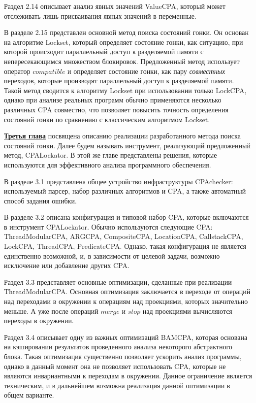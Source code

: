 Раздел 2.14 описывает анализ явных значений ValueCPA, который может отслеживать лишь присваивания явных значений в переменные.

В разделе 2.15 представлен основной метод поиска состояний гонки. 
Он основан на алгоритме Lockset, который определяет состояние гонки, как ситуацию, при которой происходит параллельный доступ к разделяемой памяти с непересекающимся множеством блокировок.
Предложенный метод использует оператор $compatible$ и определяет состояние гонки, как пару \textit{совместных} переходов, которые производят параллельный доступ к разделяемой памяти.
Такой метод сводится к алгоритму Lockset при использовании только LockCPA, однако при анализе реальных программ обычно применяются несколько различных CPA совместно, что позволяет повысить точность определения состояний гонки по сравнению с классическим алгоритмом Lockset.

\underline{\textbf{Третья глава}} посвящена описанию реализации разработанного метода поиска состояний гонки.
Далее будем называть инструмент, реализующий предложенный метод, CPALockator.
В этой же главе представлены решения, которые используются для эффективного анализа программного обеспечения.

В разделе 3.1 представлена общее устройство инфраструктуры CPAchecker: используемый парсер, набор различных алгоритмов и CPA, а также автоматный способ задания ошибки.

В разделе 3.2 описана конфигурация и типовой набор CPA, которые включаются в инструмент CPALockator.
Обычно используются следующие CPA: ThreadModularCPA, ARGCPA, CompositeCPA, LocationCPA, CallstackCPA, LockCPA, ThreadCPA, PredicateCPA.
Однако, такая конфигурация не является единственно возможной, и, в зависимости от целевой задачи, возможно исключение или добавление других CPA.

Раздел 3.3 представляет основные оптимизации, сделанные при реализации ThreadModularCPA. 
Основная оптимизация заключается в переходе от операций над переходами в окружении к операциям над проекциями, которых значительно меньше.
А уже после операций $merge$ и $stop$ над проекциями вычисляются переходы в окружении.

Раздел 3.4 описывает одну из важных оптимизаций BAMCPA, которая основана на кэшировании результатов проведенного анализа некоторого абстрактного блока.
Такая оптимизация существенно позволяет ускорить анализ программы, однако в данный момент она не позволяет использовать CPA, которые не являются инвариантными к переходам в окружении.
Данное ограничение является техническим, и в дальнейшем возможна реализация данной оптимизации в общем варианте.

